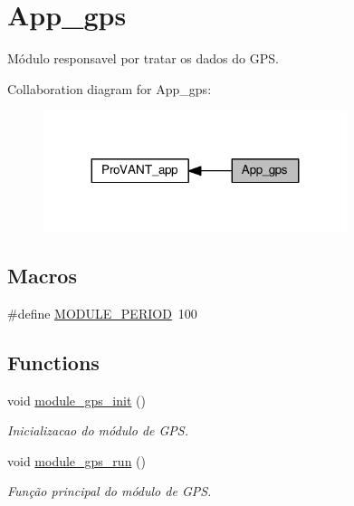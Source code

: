 \hypertarget{group__app__gps}{}\section{App\+\_\+gps}
\label{group__app__gps}


Módulo responsavel por tratar os dados do G\+PS.  


Collaboration diagram for App\+\_\+gps\+:\nopagebreak
\begin{figure}[H]
\begin{center}
\leavevmode
\includegraphics[width=251pt]{group__app__gps}
\end{center}
\end{figure}
\subsection*{Macros}
\begin{DoxyCompactItemize}
\item 
\#define \hyperlink{group__app__gps_ga0ac6c9f2991b096e49c354e5cce6fae0}{M\+O\+D\+U\+L\+E\+\_\+\+P\+E\+R\+I\+OD}~100
\end{DoxyCompactItemize}
\subsection*{Functions}
\begin{DoxyCompactItemize}
\item 
void \hyperlink{group__app__gps_ga9ee93102a0a5aec6877376bbcaf1dcb0}{module\+\_\+gps\+\_\+init} ()
\begin{DoxyCompactList}\small\item\em Inicializacao do módulo de G\+PS. \end{DoxyCompactList}\item 
void \hyperlink{group__app__gps_gace423457cfae0d22bd57db9e2fb4c033}{module\+\_\+gps\+\_\+run} ()
\begin{DoxyCompactList}\small\item\em Função principal do módulo de G\+PS. \end{DoxyCompactList}\end{DoxyCompactItemize}
